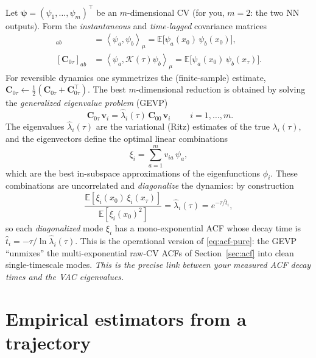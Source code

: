 \documentclass[11pt]{article}
\theoremstyle{plain}
\theoremstyle{definition}
\newcommand{\Kop}{\mathcal{K}}
\newcommand{\inner}[2]{\left\langle #1 , #2 \right\rangle_{\mu}}
\newcommand{\E}{\mathbb{E}}
\newcommand{\Cmat}{\mathbf{C}}
\begin{document}
Let $\bm\psi=(\psi_1,\dots,\psi_m)^\top$ be an $m$-dimensional CV (for you, $m=2$:
the two NN outputs). Form the \emph{instantaneous} and \emph{time-lagged}
covariance matrices
\begin{align}
[\Cmat_{00}]_{ab}&=\inner{\psi_a}{\psi_b}=\E\!\big[\psi_a(x_0)\,\psi_b(x_0)\big],\\
[\Cmat_{0\tau}]_{ab}&=\inner{\psi_a}{\Kop(\tau)\psi_b}=\E\!\big[\psi_a(x_0)\,\psi_b(x_\tau)\big].
\end{align}
For reversible dynamics one symmetrizes the (finite-sample) estimate,
$\Cmat_{0\tau}\leftarrow\tfrac12(\Cmat_{0\tau}+\Cmat_{0\tau}^\top)$. The best
$m$-dimensional reduction is obtained by solving the \emph{generalized eigenvalue
problem} (GEVP)
\begin{equation}
\boxed{\;\Cmat_{0\tau}\,\bm v_i=\hat\lambda_i(\tau)\,\Cmat_{00}\,\bm v_i\;}
\qquad i=1,\dots,m .
\label{eq:gevp}
\end{equation}
The eigenvalues $\hat\lambda_i(\tau)$ are the variational (Ritz) estimates of the
true $\lambda_i(\tau)$, and the eigenvectors define the optimal linear combinations
\begin{equation}
\xi_i=\sum_{a=1}^m v_{ia}\,\psi_a ,
\end{equation}
which are the best in-subspace approximations of the eigenfunctions $\phi_i$. These
combinations are uncorrelated and \emph{diagonalize} the dynamics: by construction
\begin{equation}
\frac{\E[\xi_i(x_0)\,\xi_i(x_\tau)]}{\E[\xi_i(x_0)^2]}
=\hat\lambda_i(\tau)=e^{-\tau/\hat t_i},
\label{eq:diag-acf}
\end{equation}
so each \emph{diagonalized} mode $\xi_i$ has a mono-exponential ACF whose decay time
is $\hat t_i=-\tau/\ln\hat\lambda_i(\tau)$. This is the operational version of
\eqref{eq:acf-pure}: the GEVP ``unmixes'' the multi-exponential raw-CV ACFs of
Section~\ref{sec:acf} into clean single-timescale modes. \emph{This is the precise
link between your measured ACF decay times and the VAC eigenvalues.}

\section{Empirical estimators from a trajectory}
\label{sec:estimators}
\end{document}
